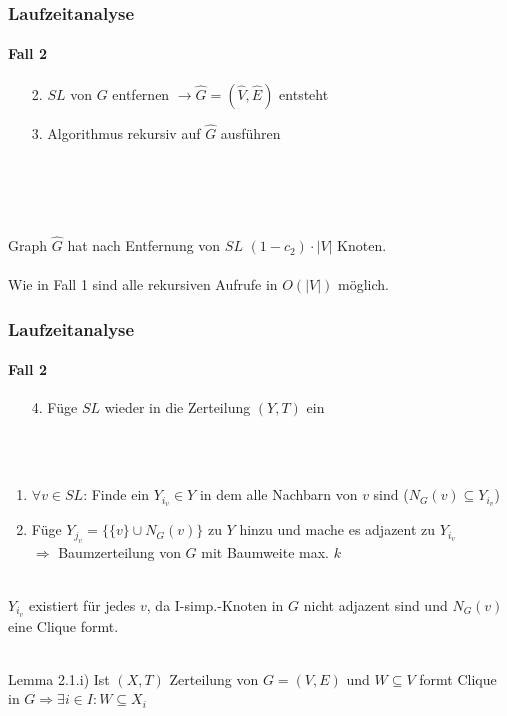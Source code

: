 \begin{frame}
\frametitle{Laufzeitanalyse}
\framesubtitle{Fall 2}

\begin{enumerate}
	\item[2.] $SL$ von $G$ entfernen $\rightarrow \widehat{G}=(\widehat{V}, \widehat{E})$ entsteht %
	\item[3.] Algorithmus rekursiv auf $\widehat{G}$ ausführen
\end{enumerate}
\ \\
\ \\
\ \\
\ \\
Graph $\widehat{G}$ hat nach Entfernung von $SL$ $(1 - c_2) \cdot |V|$ Knoten. \\
\ \\
Wie in Fall 1 sind alle rekursiven Aufrufe in $O(|V|)$ möglich. \\

\end{frame}


\begin{frame}
\frametitle{Laufzeitanalyse}
\framesubtitle{Fall 2}

\begin{enumerate}
	\item[4.] Füge $SL$ wieder in die Zerteilung $(Y,T)$ ein
\end{enumerate}
\ \\
\ \\
\begin{enumerate}
	\item $\forall v \in SL$: Finde ein $Y_{i_v} \in Y$ in dem alle Nachbarn von $v$ sind ($N_G(v) \subseteq Y_{i_v}$)
	\item Füge $Y_{j_v} = \{ \{v\} \cup N_G(v) \}$ zu $Y$ hinzu und mache es adjazent zu $Y_{i_v}$ \\
	$\Rightarrow$ Baumzerteilung von $G$ mit Baumweite max. $k$
\end{enumerate}
\ \\



$Y_{i_v}$ existiert für jedes $v$, da I-simp.-Knoten in $G$ nicht adjazent sind und $N_G(v)$ eine Clique formt. \\
\ \\
\begin{KITinfoblock}{Lemma 2.1.i)}
	Ist $(X,T)$ Zerteilung von $G=(V,E)$ und $W \subseteq V$ formt Clique in $G \Rightarrow \exists i \in I: W \subseteq X_i$
\end{KITinfoblock}

\end{frame}


